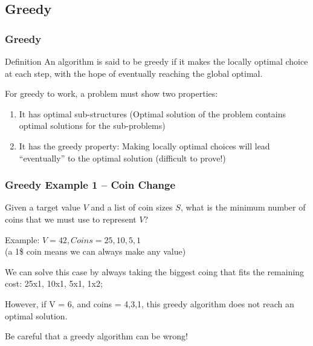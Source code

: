 \documentclass{beamer}
\begin{document}
\subsection{Greedy}
\begin{frame}
  \frametitle{Greedy}

  \begin{block}{Definition}
    An algorithm is said to be greedy if it makes the locally optimal
    choice at each step, with the hope of eventually reaching the
    global optimal.
  \end{block}

  \vfill

  For greedy to work, a problem must show two properties:
  \begin{enumerate}
  \item It has optimal sub-structures (Optimal solution of the problem
    contains optimal solutions for the sub-problems)
  \item It has the greedy property: Making locally optimal choices
    will lead ``eventually'' to the optimal solution (difficult to
    prove!)
  \end{enumerate}

\end{frame}

\begin{frame}
  \frametitle{Greedy Example 1 -- Coin Change}

  Given a target value $V$ and a list of coin sizes $S$, what is the
  minimum number of coins that we must use to represent $V$?

  \bigskip

  \begin{block}{Example:}
    $V = 42, Coins = 25, 10, 5, 1$\\
    {\small (a 1\$ coin means we can always make any value)}
  \end{block}

  \bigskip

  We can solve this case by always taking the biggest coing that fits
  the remaining cost: 25x1, 10x1, 5x1, 1x2;

  \medskip

  However, if V = 6, and coins = 4,3,1, this greedy algorithm does not
  reach an optimal solution.

  \begin{center}
    Be careful that \alert{a greedy algorithm can be wrong!}
  \end{center}
\end{frame}
\end{document}
